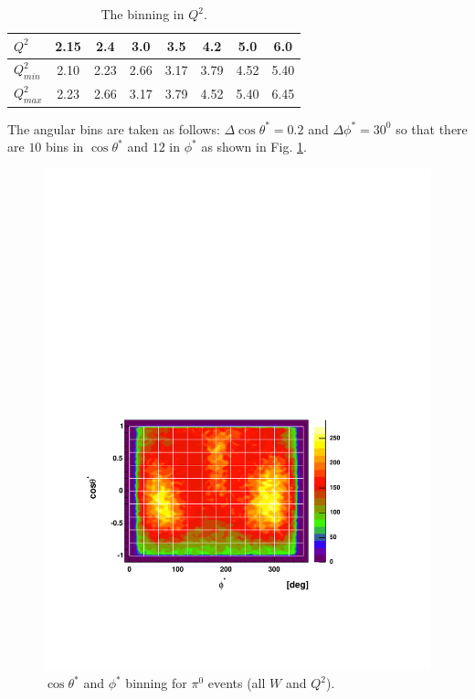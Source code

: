 \begin{table}[h]
 \begin{center}
  \begin{tabular}{|l|c|c|c|c|c|c|c|}
    \hline 
   $Q^2$        & 2.15  & 2.4  & 3.0  & 3.5  & 4.2  & 5.0  & 6.0 \\ 
    \hline  
   $Q^2_{min}$  & 2.10 & 2.23 & 2.66 & 3.17 & 3.79 & 4.52 & 5.40 \\
   \hline
   $Q^2_{max}$  & 2.23 & 2.66 & 3.17 & 3.79 & 4.52 & 5.40 & 6.45\\       
 \hline
  \end{tabular}
 \end{center} 
 \caption[The binning in $Q^2$]
         { The binning in $Q^2$.}
 \label{tab:binning}
\end{table}

The angular bins are taken as follows:
$\Delta \cos\theta^* = 0.2$ and $\Delta\phi^* = 30^0$ so that there are $10$ bins in  $\cos\theta^*$ and $12$ in $\phi^*$
as shown in  Fig. \ref{fig:binning2}.
\begin{figure}[h]
 \begin{center}
  \includegraphics[width=12cm, bb=60 120 480 460]{analysis/img/binning2}
  \caption[$\cos\theta^*$ and $\phi^*$ binning for $\pi^0$ events]
          { $\cos\theta^*$ and $\phi^*$ binning for $\pi^0$ events (all $W$ and $Q^2$).}
 \label{fig:binning2}
\end{center} 
\end{figure}









